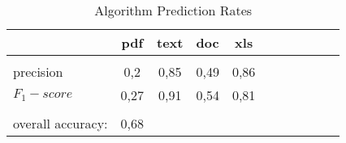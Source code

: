 \begin{table}[H]
\centering
\caption{Algorithm Prediction Rates}
\label{table:overall_results}
\colorbox{blue!25}{

\begin{tabular}{ l c c c c c c c c c c }
\hline
\hline

                 & pdf   &  text  &  doc  &  xls  \\ 
\hline
\\[0.2ex]
precision 		 & 0,2  &  0,85  & 0,49   & 0,86    \\[0.8ex]
${F_1}-score$	 & 0,27  &  0,91  & 0,54   & 0,81       \\\\[0.8ex]

overall accuracy:  & 0,68 &  &  &     \\ [0.8ex]

\end{tabular}}
\end{table}